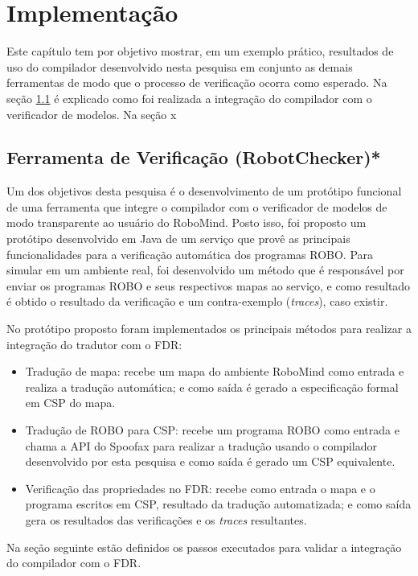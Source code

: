 \chapter{Implementação}

Este capítulo tem por objetivo mostrar, em um exemplo prático, resultados de uso do compilador desenvolvido nesta pesquisa em conjunto as demais ferramentas de modo que o processo de verificação ocorra como esperado. Na seção \ref{sub:sec41} é explicado como foi realizada a integração do compilador com o verificador de modelos. Na seção x 

\section{Ferramenta de Verificação (RobotChecker)*}
\label{sub:sec41}

Um dos objetivos desta pesquisa é o desenvolvimento de um protótipo funcional de uma ferramenta que integre o compilador com o verificador de modelos de modo transparente ao usuário do RoboMind. Posto isso, foi proposto um protótipo desenvolvido em Java de um serviço que provê as principais funcionalidades para a verificação automática dos programas ROBO. Para simular em um ambiente real, foi desenvolvido um método que é responsável por enviar os programas ROBO e seus respectivos mapas ao serviço, e como resultado é obtido o resultado da verificação e um contra-exemplo (\textit{traces}), caso existir.

No protótipo proposto foram implementados os principais métodos para realizar a integração do tradutor com o FDR:
\begin{itemize}
    \item Tradução de mapa: recebe um mapa do ambiente RoboMind como entrada e realiza a tradução automática; e como saída é gerado a especificação formal em CSP do mapa.
    \item Tradução de ROBO para CSP: recebe um programa ROBO como entrada e chama a API do Spoofax para realizar a tradução usando o compilador desenvolvido por esta pesquisa e como saída é gerado um CSP equivalente.
    \item Verificação das propriedades no FDR: recebe como entrada o mapa e o programa escritos em CSP, resultado da tradução automatizada; e como saída gera os resultados das verificações e os \textit{traces} resultantes.
\end{itemize}

Na seção seguinte estão definidos os passos executados para validar a integração do compilador com o FDR.

